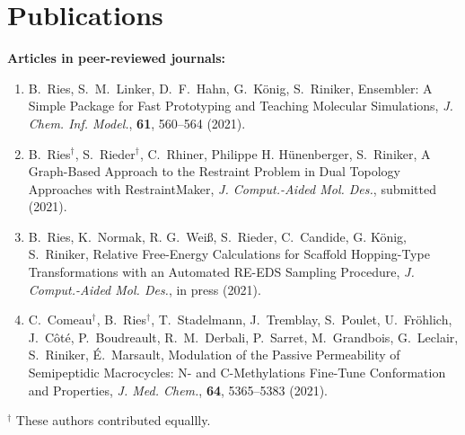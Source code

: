 \chapter{Publications}
\noindent \textbf{Articles in peer-reviewed journals:}
\begin{enumerate}
\item B.\ Ries, S.\ M.\ Linker, D.\ F.\ Hahn, G.\ K\"onig, S.\ Riniker, Ensembler: A Simple Package for Fast Prototyping and Teaching Molecular Simulations, {\em J. Chem. Inf. Model.}, \textbf{61}, 560--564 (2021).

\item B.\ Ries$^\dag$, S.\ Rieder$^\dag$, C.\ Rhiner, Philippe H. H\"unenberger, S.\ Riniker, A Graph-Based Approach to the Restraint Problem in Dual Topology Approaches with RestraintMaker, {\em  J. Comput.-Aided Mol. Des.}, submitted (2021).

\item B.\ Ries, K.\ Normak, R. G.\ Wei\ss, S.\ Rieder, C.\ Candide, G. K\"onig, S.\ Riniker, Relative Free-Energy Calculations for Scaffold Hopping-Type Transformations with an Automated RE-EDS Sampling Procedure, {\em J. Comput.-Aided Mol. Des.}, in press (2021).

\item C.\ Comeau$^\dag$, B.\ Ries$^\dag$, T.\ Stadelmann, J.\ Tremblay, S.\ Poulet, U.\ Fröhlich, J.\ Côté, P.\ Boudreault, R.\ M.\ Derbali, P.\ Sarret, M.\ Grandbois, G.\ Leclair, S.\ Riniker, \'E.\ Marsault, Modulation of the Passive Permeability of Semipeptidic Macrocycles: N- and C-Methylations Fine-Tune Conformation and Properties, {\em J. Med. Chem.}, \textbf{64}, 5365--5383 (2021).
\end{enumerate}
\noindent $^\dag$ These authors contributed equallly. \\

